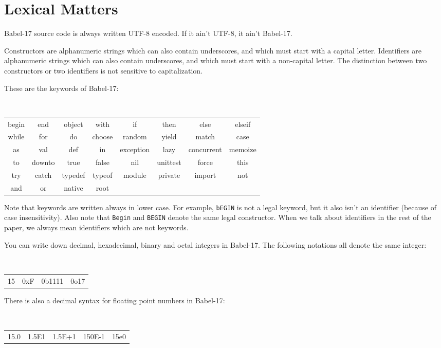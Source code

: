 \documentclass[11pt]{amsart}
\begin{document}
\section{Lexical Matters}
Babel-17 source code is always written UTF-8 encoded. If it ain't UTF-8, it ain't Babel-17. 

Constructors are alphanumeric strings which can also contain underscores, and which must start with a capital letter. 
Identifiers are alphanumeric strings which can also contain underscores, and which must start with a non-capital letter.
The distinction between two constructors or two identifiers is not sensitive to capitalization.

These are the keywords of Babel-17:
\begin{center}
\tt
\begin{tabular}{cccccccc}
begin & end & object & with & if & then & else & elseif \\
while &  for & do & choose & random & yield & match & case \\
as & val & def & in & exception & lazy & concurrent & memoize \\
to & downto & true & false & nil & unittest &  force & this \\
try & catch &  typedef &  typeof &  module &  private &  import & not  \\
and & or & native &  root &  &   &  & 
\end{tabular}
\end{center}
Note that keywords are written always in lower case. For example, {\tt bEGIN} is not a legal keyword, but it also isn't an identifier (because of case insensitivity). Also note that {\tt Begin} and {\tt BEGIN} denote the same legal constructor. When we talk about identifiers in the rest of the paper, we always mean identifiers which are not keywords.

You can write down decimal, hexadecimal, binary and octal integers in Babel-17. The following notations all denote the same integer:
\begin{center}
\tt
\begin{tabular}{cccc}
15 & 0xF & 0b1111 &  0o17
\end{tabular}
\end{center}

There is also a decimal syntax for floating point numbers in Babel-17:
\begin{center}
\tt
\begin{tabular}{ccccc}
15.0 & 1.5E1 & 1.5E+1 &  150E-1 & 15e0
\end{tabular}
\end{center}
\end{document}
